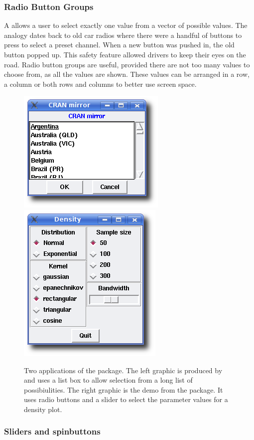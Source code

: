 \subsubsection{Radio Button Groups}
\label{sec:GUI:radio=button-groups}

A  allows a user to select exactly one value
from a vector of possible values. The analogy dates back to old car
radios where there were a handful of buttons to press to select a
preset channel. When a new button was pushed in, the old button popped
up. This safety feature allowed drivers to keep their eyes on the
road.  Radio button groups are useful, provided there are not too many
values to choose from, as all the values are shown. These values can
be arranged in a row, a column or both rows and columns to better use
screen space.

\begin{figure}
  \centering
  \includegraphics[width=.35\textwidth]{ex-listbox}
  \includegraphics[width=.35\textwidth]{tcltk-tkdensity}
  \caption{
    Two applications of the  package. 
    The left graphic is
    produced by  and uses a list box to
    allow selection from a long list of possibiulities.
    The right graphic is the  demo from the
    package. It uses radio buttons and a slider to select the
    parameter values for a density plot.
  }
  \label{fig:GUI:ex-tcltk}
\end{figure}

\subsubsection{Sliders and spinbuttons}
\label{sec:GUI:sliders}

